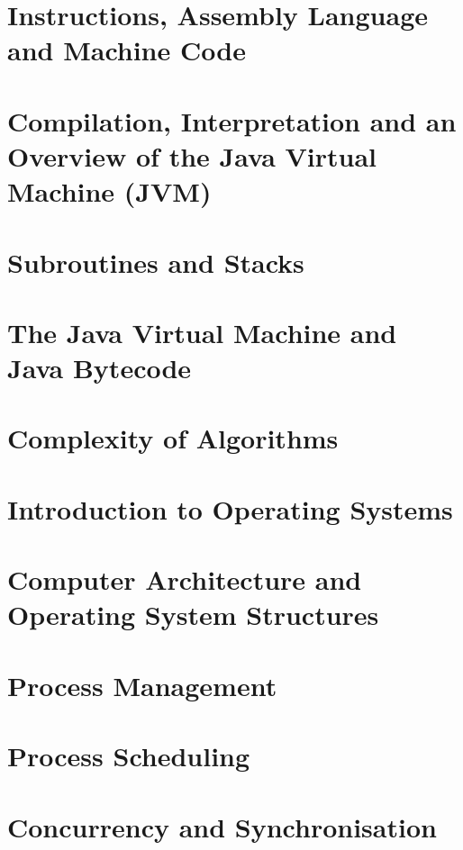 \documentclass[
  11pt,
  a4paper,
]{article}
\begin{document}
\section{Instructions, Assembly Language and Machine Code}


\section[Compilation, Interpretation and the JVM]{Compilation, Interpretation and an Overview of the Java Virtual Machine (JVM)}


\section{Subroutines and Stacks}


\section[The JVM and Java Bytecode]{The Java Virtual Machine and Java Bytecode}


\section{Complexity of Algorithms}



\section{Introduction to Operating Systems}


\section[Computer Architecture and OS Structures]{Computer Architecture and Operating System Structures}


\section{Process Management}


\section{Process Scheduling}



\section{Concurrency and Synchronisation}

\end{document}
